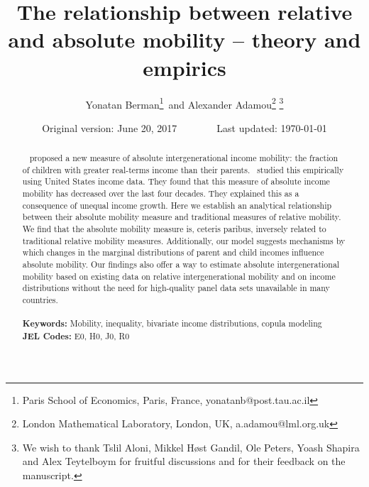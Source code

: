 \documentclass[12pt]{article}
\numberwithin{equation}{section}
\begin{document}
\onehalfspacing

\begin{titlepage}
\title{The relationship between relative and absolute mobility -- theory and empirics}
\author{Yonatan Berman\footnote{Paris School of Economics, Paris, France, yonatanb@post.tau.ac.il}\, and Alexander Adamou\footnote{London Mathematical Laboratory, London, UK, a.adamou@lml.org.uk} \thanks{We wish to thank Tslil Aloni, Mikkel H\o st Gandil, Ole Peters, Yoash Shapira and Alex Teytelboym for fruitful discussions and for their feedback on the manuscript.}}
\date{Original version: June 20, 2017\,\,\,\,\,\,\,\,\,\,\,\,\,\,\,\,\,\,\,\,\,\,\,\,Last updated: \today}
\maketitle
\begin{abstract}
\noindent~\citet{chetty2014land} proposed a new measure of absolute intergenerational income mobility: the fraction of children with greater real-terms income than their parents.~\citet{chetty2017fading} studied this empirically using United States income data. They found that this measure of absolute income mobility has decreased over the last four decades. %
They explained this as a consequence of unequal income growth. Here we establish an analytical relationship between their absolute mobility measure and traditional measures of relative mobility. %
We find that the absolute mobility measure is, ceteris paribus, inversely related to traditional relative mobility measures. Additionally, our model suggests mechanisms by which changes in the marginal distributions of parent and child incomes influence absolute mobility. Our findings also offer a way to estimate absolute intergenerational mobility based on existing data on relative intergenerational mobility and on income distributions without the need for high-quality panel data sets unavailable in many countries.
\\
\\
\noindent\textbf{Keywords:} Mobility, inequality, bivariate income distributions, copula modeling
\\
\noindent\textbf{JEL Codes:} E0, H0, J0, R0\\

\bigskip
\end{abstract}
\setcounter{page}{0}
\thispagestyle{empty}
\end{titlepage}
\pagebreak \newpage
\end{document}
